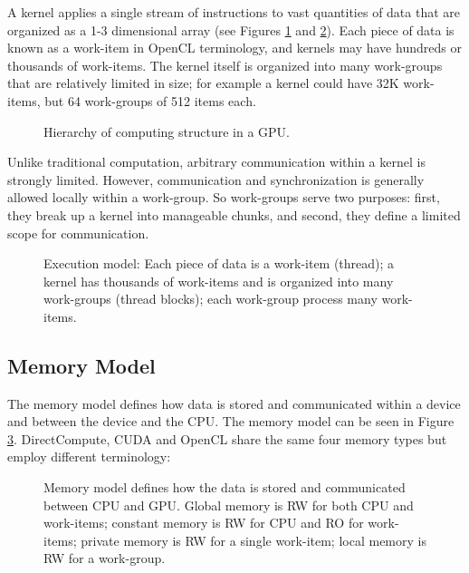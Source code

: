 \documentclass[review]{elsarticle}
\begin{document}
A kernel applies a single stream of instructions to vast quantities of data that are organized as a 1-3 dimensional array (see Figures \ref{figure:captura1paperCEC} and \ref{figure:grid}). Each piece of data is known as a work-item in OpenCL terminology, and kernels may have hundreds or thousands of work-items. The kernel itself is organized into many work-groups that are relatively limited in size; for example a kernel could have 32K work-items, but 64 work-groups of 512 items each. 

\begin{figure}[!ht]
\centerline{}
\caption{Hierarchy of computing structure in a GPU.}
\label{figure:captura1paperCEC}
\end{figure}

Unlike traditional computation, arbitrary communication within a kernel is strongly limited. However, communication and synchronization is generally allowed locally within a work-group. So work-groups serve two purposes: first, they break up a kernel into manageable chunks, and second, they define a limited scope for communication. 

\begin{figure}[!ht]
\centerline{}
\caption{Execution model: Each piece of data is a work-item (thread); a kernel has thousands of work-items and is organized into many work-groups (thread blocks); each work-group process many work-items.}
\label{figure:grid}
\end{figure}

\subsection{Memory Model}

The memory model defines how data is stored and communicated within a device and between the device and the CPU. The memory model can be seen in Figure \ref{figure:memory}. DirectCompute, CUDA and OpenCL share the same four memory types but employ different terminology:

\begin{figure}
\centerline{}
\caption{Memory model defines how the data is stored and communicated between CPU and GPU. Global memory is RW for both CPU and work-items; constant memory is RW for CPU and RO for work-items; private memory is RW for a single work-item; local memory is RW for a work-group.}
\label{figure:memory}
\end{figure}
\end{document}

